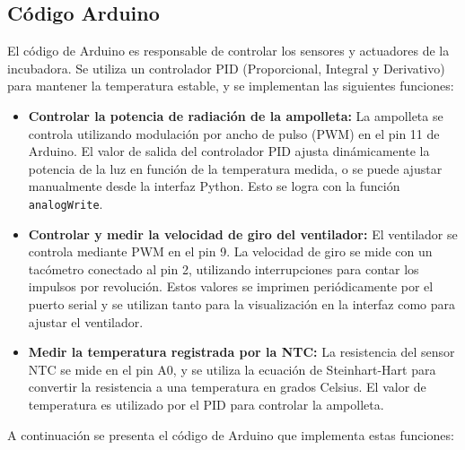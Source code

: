 \documentclass[spanish, a4paper, 11pt]{article}
\begin{document}
\subsection{Código Arduino}

El código de Arduino es responsable de controlar los sensores y actuadores de la incubadora. Se utiliza un controlador PID (Proporcional, Integral y Derivativo) para mantener la temperatura estable, y se implementan las siguientes funciones:

\begin{itemize}
    \item {\bf Controlar la potencia de radiación de la ampolleta:} La ampolleta se controla utilizando modulación por ancho de pulso (PWM) en el pin 11 de Arduino. El valor de salida del controlador PID ajusta dinámicamente la potencia de la luz en función de la temperatura medida, o se puede ajustar manualmente desde la interfaz Python. Esto se logra con la función \texttt{analogWrite}.

    \item {\bf Controlar y medir la velocidad de giro del ventilador:} El ventilador se controla mediante PWM en el pin 9. La velocidad de giro se mide con un tacómetro conectado al pin 2, utilizando interrupciones para contar los impulsos por revolución. Estos valores se imprimen periódicamente por el puerto serial y se utilizan tanto para la visualización en la interfaz como para ajustar el ventilador.

    \item {\bf Medir la temperatura registrada por la NTC:} La resistencia del sensor NTC se mide en el pin A0, y se utiliza la ecuación de Steinhart-Hart para convertir la resistencia a una temperatura en grados Celsius. El valor de temperatura es utilizado por el PID para controlar la ampolleta.

\end{itemize}

A continuación se presenta el código de Arduino que implementa estas funciones:
\end{document}
